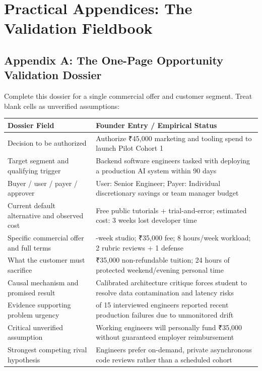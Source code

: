 \section*{Practical Appendices: The Validation Fieldbook}

\subsection*{Appendix A: The One-Page Opportunity Validation Dossier}

Complete this dossier for a single commercial offer and customer segment. Treat blank cells as unverified assumptions:

\begin{table}[t]
\centering
\small
\begin{tabularx}{\textwidth}{>{\raggedright\arraybackslash}p{5.5cm} >{\raggedright\arraybackslash}X}
\toprule
\textbf{Dossier Field} & \textbf{Founder Entry / Empirical Status} \\
\midrule
Decision to be authorized & Authorize ₹45,000 marketing and tooling spend to launch Pilot Cohort 1 \\
Target segment and qualifying trigger & Backend software engineers tasked with deploying a production AI system within 90 days \\
Buyer / user / payer / approver & User: Senior Engineer; Payer: Individual discretionary savings or team manager budget \\
Current default alternative and observed cost & Free public tutorials + trial-and-error; estimated cost: 3 weeks lost developer time \\
Specific commercial offer and full terms & 3-week studio; ₹35,000 fee; 8 hours/week workload; 2 rubric reviews + 1 defense \\
What the customer must sacrifice & ₹35,000 non-refundable tuition; 24 hours of protected weekend/evening personal time \\
Causal mechanism and promised result & Calibrated architecture critique forces student to resolve data contamination and latency risks \\
Evidence supporting problem urgency & 12 of 15 interviewed engineers reported recent production failures due to unmonitored drift \\
Critical unverified assumption & Working engineers will personally fund ₹35,000 without guaranteed employer reimbursement \\
Strongest competing rival hypothesis & Engineers prefer on-demand, private asynchronous code reviews rather than a scheduled cohort \\

\end{tabularx}
\end{table}
